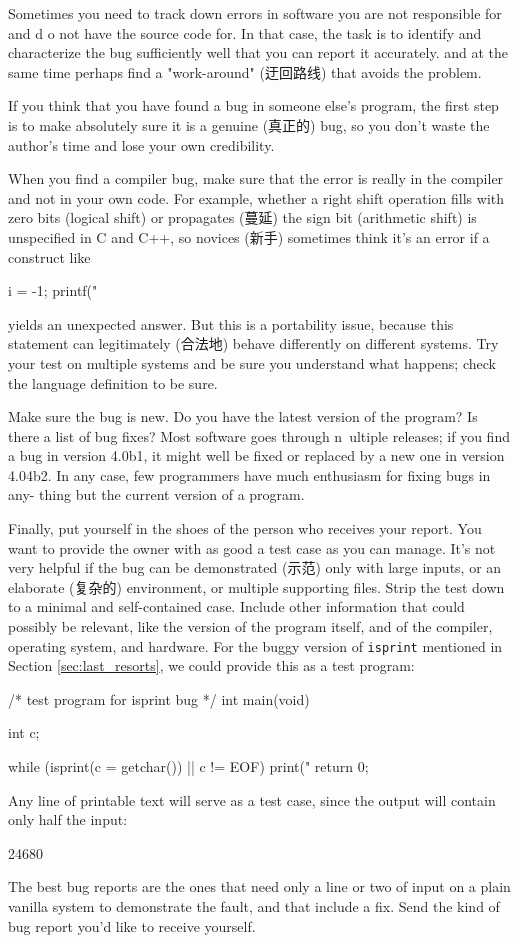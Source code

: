 Sometimes you need to track down errors in software you are not responsible
for and d o not have the source code for. In that case, the task is to
identify and characterize the bug sufficiently well that you can report it
accurately. and at the same time perhaps find a "work-around" (迂回路线)
that avoids the problem.

If you think that you have found a bug in someone else's program, the first
step is to make absolutely sure it is a genuine (真正的) bug, so you don't
waste the author's time and lose your own credibility.

When you find a compiler bug, make sure that the error is really in the
compiler and not in your own code. For example, whether a right shift
operation fills with zero bits (logical shift) or propagates (蔓延) the
sign bit (arithmetic shift) is unspecified in C and C++, so novices (新手)
sometimes think it's an error if a construct like
\begin{badcode}
    i = -1;
    printf("%
\end{badcode}
yields an unexpected answer. But this is a portability issue, because this
statement can legitimately (合法地) behave differently on different
systems. Try your test on multiple systems and be sure you understand what
happens; check the language definition to be sure.

Make sure the bug is new. Do you have the latest version of the program? Is
there a list of bug fixes? Most software goes through n~ultiple releases;
if you find a bug in version 4.0b1, it might well be fixed or replaced by a
new one in version 4.04b2. In any case, few programmers have much
enthusiasm for fixing bugs in any- thing but the current version of a
program.

Finally, put yourself in the shoes of the person who receives your report.
You want to provide the owner with as good a test case as you can manage.
It's not very helpful if the bug can be demonstrated (示范) only with large
inputs, or an elaborate (复杂的) environment, or multiple supporting files.
Strip the test down to a minimal and self-contained case. Include other
information that could possibly be relevant, like the version of the
program itself, and of the compiler, operating system, and hardware.  For
the buggy version of \verb'isprint' mentioned in Section
\ref{sec:last_resorts}, we could provide this as a test program:
\begin{wellcode}
    /* test program for isprint bug */
    int main(void)
    {
        int c;

        while (isprint(c = getchar()) || c != EOF)
            print("%
        return 0;
    }
\end{wellcode}
Any line of printable text will serve as a test case, since the output will
contain only half the input:
\begin{wellcode}
    24680
\end{wellcode}

The best bug reports are the ones that need only a line or two of input on
a plain vanilla system to demonstrate the fault, and that include a fix.
Send the kind of bug report you'd like to receive yourself.
